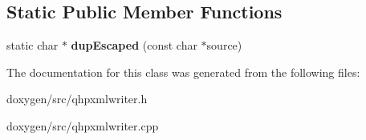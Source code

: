 \subsection*{Static Public Member Functions}
\begin{DoxyCompactItemize}
\item 
\mbox{\label{class_qhp_xml_writer_acd457ef30a549b6677dbb4539a89e5fb}} 
static char $\ast$ {\bfseries dup\+Escaped} (const char $\ast$source)
\end{DoxyCompactItemize}


The documentation for this class was generated from the following files\+:\begin{DoxyCompactItemize}
\item 
doxygen/src/qhpxmlwriter.\+h\item 
doxygen/src/qhpxmlwriter.\+cpp\end{DoxyCompactItemize}

